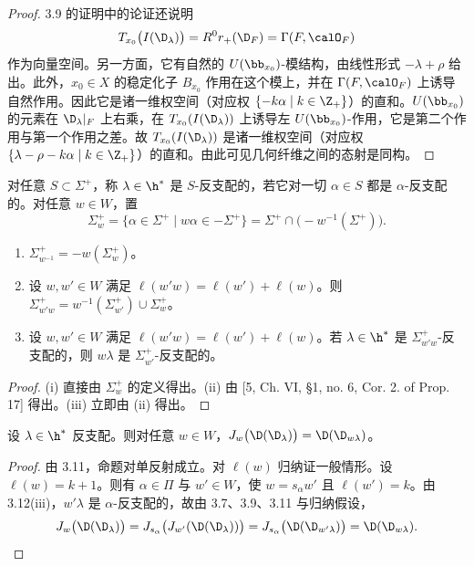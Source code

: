 \begin{proof}
3.9 的证明中的论证还说明
$$T_{x_0}\bigl(I(\D_\lambda)\bigr)=R^0r_+(\D_F)=\Gamma(F,\calO_F)$$
作为向量空间。另一方面，它有自然的 $U(\bb_{x_0})$-模结构，由线性形式 $-\lambda+\rho$ 给出。此外，$x_0\in X$ 的稳定化子 $B_{x_0}$ 作用在这个模上，并在 $\Gamma(F,\calO_F)$ 上诱导自然作用。因此它是诸一维权空间（对应权 $\{-k\alpha\mid k\in\Z_+\}$）的直和。$U(\bb_{x_0})$ 的元素在 $\D_\lambda|_F$ 上右乘，在 $T_{x_0}(I(\D_\lambda))$ 上诱导左 $U(\bb_{x_0})$-作用，它是第二个作用与第一个作用之差。故 $T_{x_0}(I(\D_\lambda))$ 是诸一维权空间（对应权 $\{\lambda-\rho-k\alpha\mid k\in\Z_+\}$）的直和。由此可见几何纤维之间的态射是同构。
\end{proof}

对任意 $S\subset\Sigma^+$，称 $\lambda\in\h^*$ 是 $S$-反支配的，若它对一切 $\alpha\in S$ 都是 $\alpha$-反支配的。对任意 $w\in W$，置
$$\Sigma^+_w=\{\alpha\in\Sigma^+\mid w\alpha\in-\Sigma^+\}=\Sigma^+\cap\bigl(-w^{-1}(\Sigma^+)\bigr).$$

\begin{lemma}\label{lem:03.3.12}
\begin{enumerate}[label=(\roman*),leftmargin=2.2em,itemsep=0pt,topsep=2pt]
\item $\Sigma^+_{w^{-1}}=-w(\Sigma^+_w)$。
\item 设 $w,w'\in W$ 满足 $\ell(w'w)=\ell(w')+\ell(w)$。则 $\Sigma^+_{w'w}=w^{-1}(\Sigma^+_{w'})\cup\Sigma^+_w$。
\item 设 $w,w'\in W$ 满足 $\ell(w'w)=\ell(w')+\ell(w)$。若 $\lambda\in\h^*$ 是 $\Sigma^+_{w'w}$-反支配的，则 $w\lambda$ 是 $\Sigma^+_{w'}$-反支配的。
\end{enumerate}
\end{lemma}

\begin{proof}
(i) 直接由 $\Sigma^+_w$ 的定义得出。(ii) 由 [5, Ch. VI, §1, no. 6, Cor. 2. of Prop. 17] 得出。(iii) 立即由 (ii) 得出。
\end{proof}

\begin{lemma}\label{lem:03.3.13}
设 $\lambda\in\h^*$ 反支配。则对任意 $w\in W$，$J_w\bigl(\D(\D_\lambda)\bigr)=\D(\D_{w\lambda})$。
\end{lemma}

\begin{proof}
由 3.11，命题对单反射成立。对 $\ell(w)$ 归纳证一般情形。设 $\ell(w)=k+1$。则有 $\alpha\in\Pi$ 与 $w'\in W$，使 $w=s_\alpha w'$ 且 $\ell(w')=k$。由 3.12(iii)，$w'\lambda$ 是 $\alpha$-反支配的，故由 3.7、3.9、3.11 与归纳假设，
$$J_w\bigl(\D(\D_\lambda)\bigr)=J_{s_\alpha}\bigl(J_{w'}(\D(\D_\lambda))\bigr)=J_{s_\alpha}\bigl(\D(\D_{w'\lambda})\bigr)=\D(\D_{w\lambda}).$$
\end{proof}

